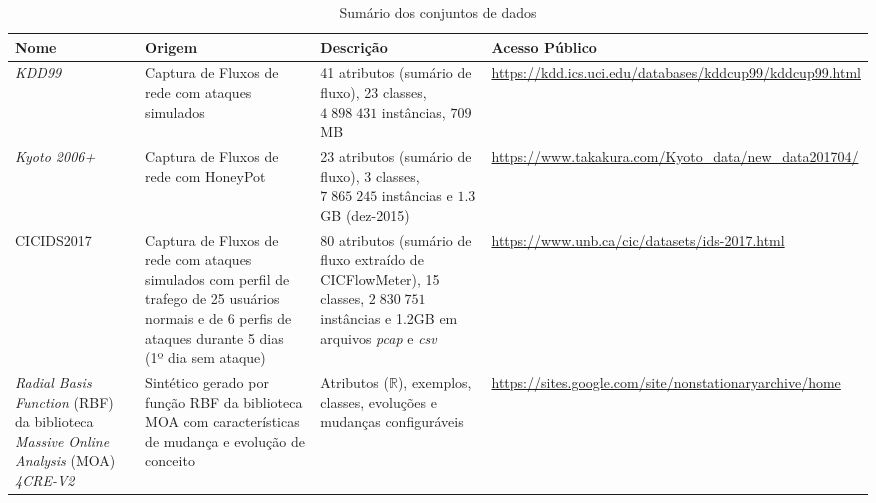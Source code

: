\begin{table}[ht]
  \caption{Sumário dos conjuntos de dados}
  \centering
  \begin{scriptsize}
  \begin{tabularx}{\linewidth}{X|X|X|X}
    Nome &
      Origem &
      Descrição &
      Acesso Público \\
    \hline
    \hline
    \emph{KDD99} \cite{Tavallaee2009Kdd,Protic2018KddKyoto} &
      Captura de Fluxos de rede com ataques simulados &
      41 atributos (sumário de fluxo), 23 classes, $4\;898\;431$ instâncias, $709$ MB &
      \url{https://kdd.ics.uci.edu/databases/kddcup99/kddcup99.html} \\
    \hline
    \emph{Kyoto 2006+} \cite{Song2011kyoto,Protic2018KddKyoto}&
      Captura de Fluxos de rede com HoneyPot &
      23 atributos (sumário de fluxo), 3 classes, $7\;865\;245$ instâncias e $1.3$ GB (dez-2015) &
      \url{https://www.takakura.com/Kyoto_data/new_data201704/} \\

    
       \hline
    CICIDS2017 \cite{Sharafaldin2018cicids2017} &
      Captura de Fluxos de rede com ataques simulados com perfil de trafego de 25
      usuários normais e de 6 perfis de ataques durante 5 dias (1º dia sem ataque) &
      80 atributos (sumário de fluxo extraído de CICFlowMeter), 15 classes,
      $2\;830\;751$ instâncias e 1.2GB em arquivos \emph{pcap} e \emph{csv} &
      \url{https://www.unb.ca/cic/datasets/ids-2017.html} \\
    \hline
    \emph{Radial Basis Function} (RBF) da biblioteca \emph{Massive Online Analysis} (MOA)
    \emph{4CRE-V2} &
      Sintético gerado por função RBF da biblioteca MOA com características de
      mudança e evolução de conceito &
      Atributos ($\mathbb{R}$), exemplos, classes, evoluções e mudanças configuráveis &
      \url{https://sites.google.com/site/nonstationaryarchive/home} \\
    \hline
  \end{tabularx}
  \label{tab:summary-dataset}
  \end{scriptsize}
\end{table}

